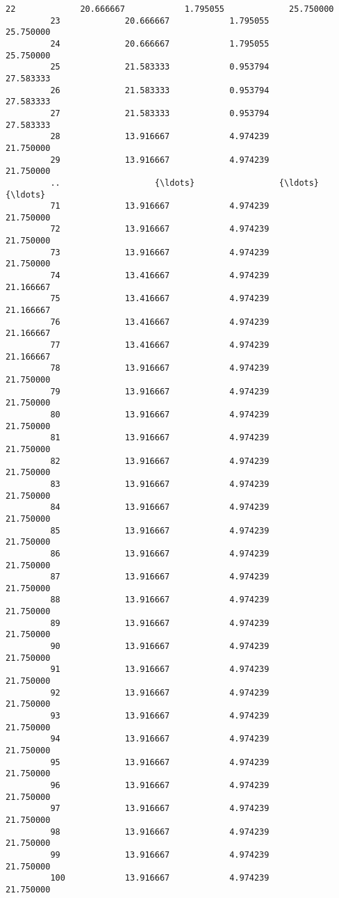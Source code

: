 \documentclass[11pt]{article}
\begin{document}
\begin{Verbatim}[commandchars=\\\{\}]
         22             20.666667            1.795055             25.750000   
         23             20.666667            1.795055             25.750000   
         24             20.666667            1.795055             25.750000   
         25             21.583333            0.953794             27.583333   
         26             21.583333            0.953794             27.583333   
         27             21.583333            0.953794             27.583333   
         28             13.916667            4.974239             21.750000   
         29             13.916667            4.974239             21.750000   
         ..                   {\ldots}                 {\ldots}                   {\ldots}   
         71             13.916667            4.974239             21.750000   
         72             13.916667            4.974239             21.750000   
         73             13.916667            4.974239             21.750000   
         74             13.416667            4.974239             21.166667   
         75             13.416667            4.974239             21.166667   
         76             13.416667            4.974239             21.166667   
         77             13.416667            4.974239             21.166667   
         78             13.916667            4.974239             21.750000   
         79             13.916667            4.974239             21.750000   
         80             13.916667            4.974239             21.750000   
         81             13.916667            4.974239             21.750000   
         82             13.916667            4.974239             21.750000   
         83             13.916667            4.974239             21.750000   
         84             13.916667            4.974239             21.750000   
         85             13.916667            4.974239             21.750000   
         86             13.916667            4.974239             21.750000   
         87             13.916667            4.974239             21.750000   
         88             13.916667            4.974239             21.750000   
         89             13.916667            4.974239             21.750000   
         90             13.916667            4.974239             21.750000   
         91             13.916667            4.974239             21.750000   
         92             13.916667            4.974239             21.750000   
         93             13.916667            4.974239             21.750000   
         94             13.916667            4.974239             21.750000   
         95             13.916667            4.974239             21.750000   
         96             13.916667            4.974239             21.750000   
         97             13.916667            4.974239             21.750000   
         98             13.916667            4.974239             21.750000   
         99             13.916667            4.974239             21.750000   
         100            13.916667            4.974239             21.750000   
         

\end{Verbatim}
\end{document}
